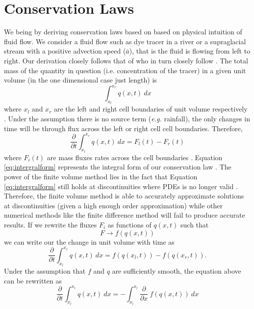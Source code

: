 \documentclass[review,onefignum,onetabnum]{siamart171218}
\begin{document}
\section{Conservation Laws}
We being by deriving conservation laws based on based on physical intuition of fluid flow. We consider a fluid flow such as dye tracer in a river or a supraglacial stream with a positive advection speed ($\bar a$), that is the fluid is flowing from left to right. Our derivation closely follows that of \cite{comp_seis} who in turn closely follow \cite{leveque_2002}. The total mass of the quantity in question (i.e. concentration of the tracer) in a given unit volume (in the one dimensional case just length) is 
\begin{equation}
    \int_{x_l}^{x_r} q(x,t) \: dx
\end{equation}
where $x_l$ and $x_r$ are the left and right cell boundaries of unit volume respectively \cite{comp_seis}. Under the assumption there is no source term (\textit{e.g.} rainfall), the only changes in time will be through flux across the left or right cell cell boundaries. Therefore, 
\begin{equation}
    \frac{\partial}{\partial t} \int_{x_l}^{x_r} q(x,t) \: dx = F_l(t) - F_r(t)
     \label{eq:intergralform}
\end{equation}
where $F_i(t)$ are mass fluxes rates across the cell boundaries \cite{comp_seis}. Equation \ref{eq:intergralform} represents the integral form of our conservation law \cite{leveque_2002}. The power of the finite volume method lies in the fact that Equation \ref{eq:intergralform} still holds at discontinuities where PDEs is no longer valid \cite{comp_seis}. Therefore, the finite volume method is able to accurately approximate solutions at discontinuities (given a high enough order approximation) while other numerical methods like the finite difference method will fail to produce accurate results. If we rewrite the fluxes $F_i$ as functions of $q(x,t)$ such that
\begin{equation}
    F \xrightarrow{} f(q(x,t)) 
\end{equation}
we can write our the change in unit volume with time as 
\begin{equation}
    \frac{\partial}{\partial t} \int_{x_l}^{x_r} q(x,t) \: dx = f(q(x_l,t))  - f(q(x_r ,t)). 
    \label{eq:eqntoint}
\end{equation}
Under the assumption that $f$ and $q$ are sufficiently smooth, the equation above can be rewritten as
\begin{equation}
     \frac{\partial}{\partial t} \int_{x_l}^{x_r} q(x,t) \: dx= - \int_{x_l}^{x_r} \frac{\partial}{\partial x } \: f(q(x,t))\: dx
\end{equation}
\end{document}
